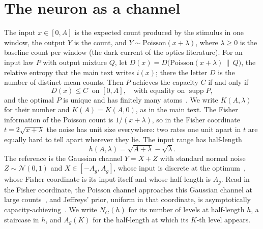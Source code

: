 \documentclass[journal]{IEEEtran}
\begin{document}
\section{The neuron as a channel}\label{sec:model}
The input $x \in [0, A]$ is the expected count produced by the stimulus in one window, the output $Y$ is the count, and $Y \sim
\mathrm{Poisson}(x + \lambda)$, where $\lambda \ge 0$ is the baseline count per window (the dark current of the optics literature).
For an input law $P$ with output mixture $Q$, let $D(x) = D\big(\mathrm{Poisson}(x + \lambda)\,\|\,Q\big)$, the relative entropy that the main text writes $i(x)$; there the letter $D$ is the number of distinct mean counts. Then $P$ achieves the
capacity $C$ if and only if
\begin{equation}
D(x) \le C \ \text{ on } [0, A], \quad \text{with equality on } \operatorname{supp} P,\label{eq:kkt}
\end{equation}
and the optimal $P$ is unique and has finitely many atoms~\cite{Shamai1990,Cao2014}. We write $K(A, \lambda)$ for their number and
$K(A) = K(A, 0)$, as in the main text. The Fisher information of the Poisson count is $1/(x + \lambda)$, so in the Fisher coordinate $t = 2\sqrt{x +
\lambda}$ the noise has unit size everywhere: two rates one unit apart in $t$ are equally hard to tell apart wherever they lie. The
input range has half-length
\begin{equation}
h(A, \lambda) = \sqrt{A + \lambda} - \sqrt{\lambda}.\label{eq:h}
\end{equation}
The reference is the Gaussian channel $Y = X + Z$ with standard normal noise $Z \sim \mathcal N(0, 1)$ and $X \in [-A_g, A_g]$, whose input is discrete at the
optimum~\cite{Smith1971}, whose Fisher coordinate is its input itself and whose half-length is $A_g$. Read in the Fisher coordinate, the
Poisson channel approaches this Gaussian channel at large counts~\cite{Tsiatmas2013}, and Jeffreys' prior, uniform in that coordinate, is
asymptotically capacity-achieving~\cite{ClarkeBarron1994}. We write $N_G(h)$ for its number of levels at half-length $h$, a staircase in $h$, and $A_g(K)$ for the
half-length at which its $K$-th level appears.
\end{document}
